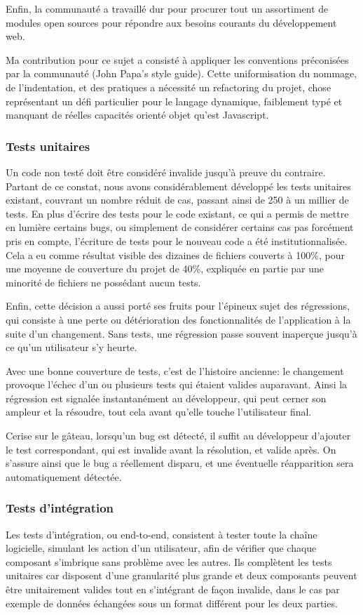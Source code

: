 \documentclass[a4paper,french,12pt]{article}
\begin{document}
	Enfin, la communauté a travaillé dur pour procurer tout un assortiment de modules open sources pour répondre aux besoins courants du développement web.
	
	Ma contribution pour ce sujet a consisté à appliquer les conventions préconisées par la communauté (John Papa's style guide). Cette uniformisation du nommage, de l'indentation, et des pratiques a nécessité un refactoring du projet, chose représentant un défi particulier pour le langage dynamique, faiblement typé et manquant de réelles capacités orienté objet qu'est Javascript.
	
		\subsubsection{Tests unitaires}
			Un code non testé doit être considéré invalide jusqu'à preuve du contraire. Partant de ce constat, nous avons considérablement développé les tests unitaires existant, couvrant un nombre réduit de cas, passant ainsi de 250 à un millier de tests. 
	En plus d'écrire des tests pour le code existant, ce qui a permis de mettre en lumière certains bugs, ou simplement de considérer certains cas pas forcément pris en compte, l'écriture de tests pour le nouveau code a été institutionnalisée. 
	Cela a eu comme résultat visible des dizaines de fichiers couverts à 100\%, pour une moyenne de couverture du projet de 40\%, expliquée en partie par une minorité de fichiers ne possédant aucun tests.
	
	Enfin, cette décision a aussi porté ses fruits pour l'épineux sujet des régressions, qui consiste à une perte ou détérioration des fonctionnalités de l'application à la suite d'un changement. Sans tests, une régression passe souvent inaperçue jusqu'à ce qu'un utilisateur s'y heurte.
	
	Avec une bonne couverture de tests, c'est de l'histoire ancienne: le changement provoque l'échec d'un ou plusieurs tests qui étaient valides auparavant. Ainsi la régression est signalée instantanément au développeur, qui peut cerner son ampleur et la résoudre, tout cela avant qu'elle touche l'utilisateur final.
	
	Cerise sur le gâteau, lorsqu'un bug est détecté, il suffit au développeur d'ajouter le test correspondant, qui est invalide avant la résolution, et valide après. On s'assure ainsi que le bug a réellement disparu, et une éventuelle réapparition sera automatiquement détectée.
	
	\subsubsection{Tests d'intégration}
	Les tests d'intégration, ou end-to-end, consistent à tester toute la chaîne logicielle, simulant les action d'un utilisateur, afin de vérifier que chaque composant s'imbrique sans problème avec les autres. Ils complètent les tests unitaires car disposent d'une granularité plus grande et deux composants peuvent être unitairement valides tout en s'intégrant de façon invalide, dans le cas par exemple de données échangées sous un format différent pour les deux parties.
	
\end{document}
